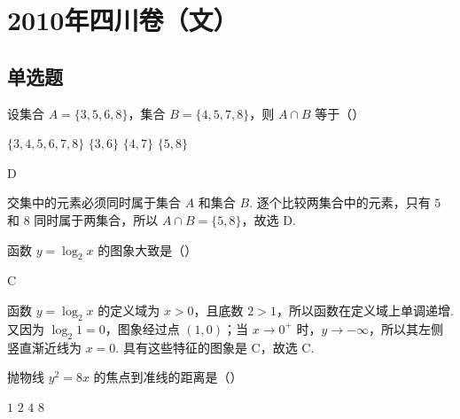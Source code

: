\chapter{2010年四川卷（文）}

\section{单选题}

\begin{problem}
设集合 \(A = \{3, 5, 6, 8\}\)，集合 \(B = \{4, 5, 7, 8\}\)，则 \(A \cap B\) 等于（\quad）

\choices
    {\( \{3, 4, 5, 6, 7, 8\} \)}
    {\(\{3,6\}\)}
    {\( \{4, 7\} \)}
    {\( \{5, 8\} \)}
\end{problem}

\begin{answer}
D
\end{answer}

\begin{solution}
交集中的元素必须同时属于集合 \(A\) 和集合 \(B\). 逐个比较两集合中的元素，只有 \(5\) 和 \(8\) 同时属于两集合，所以 \(A\cap B=\{5,8\}\)，故选 D.
\end{solution}

\begin{problem}
函数 \( y = \log_2 x \) 的图象大致是（\quad）

    {}
    {}
    {}
\end{problem}

\begin{answer}
C
\end{answer}

\begin{solution}
函数 \(y=\log_2x\) 的定义域为 \(x>0\)，且底数 \(2>1\)，所以函数在定义域上单调递增. 又因为 \(\log_2 1=0\)，图象经过点 \((1,0)\)；当 \(x\to0^+\) 时，\(y\to-\infty\)，所以其左侧竖直渐近线为 \(x=0\). 具有这些特征的图象是 C，故选 C.
\end{solution}

\begin{problem}
抛物线 \( y^{2}=8x \) 的焦点到准线的距离是（\quad）

\choices
    {\(1\)}
    {\(2\)}
    {\(4\)}
    {\(8\)}
\end{problem}

